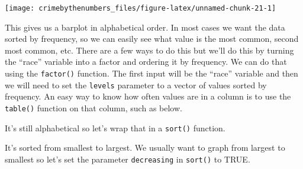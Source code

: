 \documentclass[
  12pt,
]{book}
\newenvironment{Shaded}{\begin{snugshade}}{\end{snugshade}}
\newcommand{\CommentTok}[1]{\textcolor[rgb]{0.37,0.37,0.37}{\textit{#1}}}
\newcommand{\DataTypeTok}[1]{\textcolor[rgb]{0.27,0.27,0.27}{#1}}
\newcommand{\KeywordTok}[1]{\textcolor[rgb]{0.27,0.27,0.27}{\textbf{#1}}}
\newcommand{\NormalTok}[1]{#1}
\newcommand{\OperatorTok}[1]{\textcolor[rgb]{0.43,0.43,0.43}{\textbf{#1}}}
\newcommand{\OtherTok}[1]{\textcolor[rgb]{0.37,0.37,0.37}{#1}}
\begin{document}
\begin{center}\texttt{[image: crimebythenumbers\_files/figure-latex/unnamed-chunk-21-1]} \end{center}

This gives us a barplot in alphabetical order. In most cases we want the data sorted by frequency, so we can easily see what value is the most common, second most common, etc. There are a few ways to do this but we'll do this by turning the ``race'' variable into a factor and ordering it by frequency. We can do that using the \texttt{factor()} function. The first input will be the ``race'' variable and then we will need to set the \texttt{levels} parameter to a vector of values sorted by frequency. An easy way to know how often values are in a column is to use the \texttt{table()} function on that column, such as below.

\begin{Shaded}
\end{Shaded}

It's still alphabetical so let's wrap that in a \texttt{sort()} function.

\begin{Shaded}
\end{Shaded}

It's sorted from smallest to largest. We usually want to graph from largest to smallest so let's set the parameter \texttt{decreasing} in \texttt{sort()} to TRUE.

\begin{Shaded}
\end{Shaded}
\end{document}
